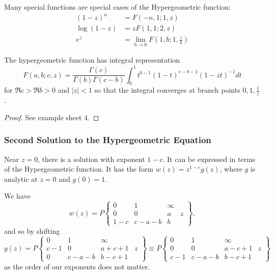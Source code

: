 \documentclass[a4paper]{article}
\begin{document}
\begin{remark}
	Many special functions are special cases of the Hypergeometric function:
	\begin{align*}
		(1-z)^{n} &= F(-n, 1; 1, z)\\
		\log(1-z) &= zF(1, 1; 2, z) \\
		e^{z} &= \lim_{b\to 0} F(1, b; 1, \frac{z}{b})
	\end{align*}
\end{remark}

\begin{prop}
	The hypergeometric function has integral representation
	\[
		F(a, b; c, z) = \frac{\Gamma(c)}{\Gamma(b)\Gamma(c-b)} \int_{0}^{1} t^{b-1} (1-t)^{c-b-1}(1-zt)^{-1}dt
	\] 
	for $\Re c > \Re b > 0$ and  $|z| < 1$ so that the integral converges at branch points $0, 1, \frac{1}{z}$.
\end{prop}

\begin{proof}
	See example sheet 4.
\end{proof}


\subsubsection{Second Solution to the Hypergeometric Equation}

Near $ z=0$, there is a solution with exponent $1-c$. It can be expressed in terms of the Hypergeometric function. It has the form  $w(z) = z^{1-c} g(z)$, where $g$ is analytic at $z=0$ and $g(0) = 1$.

We have 
\[
	w(z) = P \begin{Bmatrix} 0 & 1 & \infty & \\
		0 & 0 & a & z \\
		1-c & c-a-b & b & 
	\end{Bmatrix} 
,\] and so by shifting
\[
	g(z) = P \begin{Bmatrix} 0 & 1 & \infty & \\
                c-1 & 0 & a+c+1 & z \\
                0 & c-a-b & b-c+1 & 
        \end{Bmatrix} \equiv P \begin{Bmatrix} 0 & 1 & \infty & \\
                0 & 0 & a-c+1 & z \\
                c-1 & c-a-b & b-c+1 & 
        \end{Bmatrix}
\] as the order of our exponents does not matter.
\end{document}
